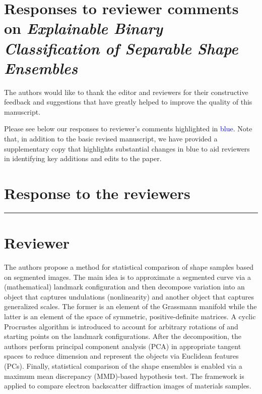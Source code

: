 \documentclass[11pt]{article}
\newcounter{reviewer}
\newcounter{point}[reviewer]
\newcommand{\reviewersection}{\stepcounter{reviewer} \bigskip \hrule
                  \section*{Reviewer \thereviewer}}
\begin{document}
\section*{Responses to reviewer comments on \textit{Explainable Binary Classification of Separable Shape Ensembles}}
\vspace{10pt}

The authors would like to thank the editor and reviewers for their constructive feedback and suggestions that have greatly helped to improve the quality of this manuscript. %

Please see below our responses to reviewer's comments highlighted in \textcolor{blue}{blue}. Note that, in addition to the basic revised manuscript, we have provided a supplementary copy that highlights substantial changes in blue to aid reviewers in identifying key additions and edits to the paper.


\section*{Response to the reviewers}

\reviewersection

The authors propose a method for statistical comparison of shape samples based on segmented images. The main idea is to approximate a segmented curve via a (mathematical) landmark configuration and then decompose variation into an object that captures undulations (nonlinearity) and another object that captures generalized scales. The former is an element of the Grassmann manifold while the latter is an element of the space of symmetric, positive-definite matrices. A cyclic Procrustes algorithm is introduced to account for arbitrary rotations of and starting points on the landmark configurations. After the decomposition, the authors perform principal component analysis (PCA) in appropriate tangent spaces to reduce dimension and represent the objects via Euclidean features (PCs). Finally, statistical comparison of the shape ensembles is enabled via a maximum mean discrepancy (MMD)-based hypothesis test. The framework is applied to compare electron backscatter diffraction images of materials samples.
\end{document}
